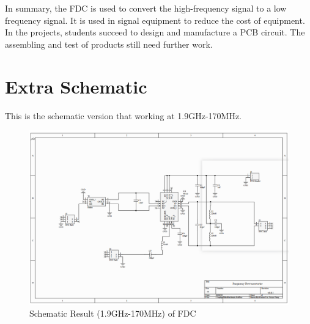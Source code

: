 \documentclass[12pt, a4paper]{report}
\begin{document}
In summary, the FDC is used to convert the high-frequency signal to a low frequency signal. It is used in signal equipment to reduce the cost of equipment. In the projects, students succeed to design and manufacture a PCB circuit. The assembling and test of products still need further work.







\singlespace


\newpage
\appendix
\appendixpage
\addappheadtotoc


\chapter{Extra Schematic}

This is the schematic version that working at 1.9GHz-170MHz.

\begin{figure}[htbp]     \begin{centering}
    \includegraphics[width=1.2\textwidth]{img/sch1.png}
    \caption{\label{Fig:sch1}Schematic Result (1.9GHz-170MHz) of FDC}
    
    \end{centering}
    
\end{figure}
\end{document}
